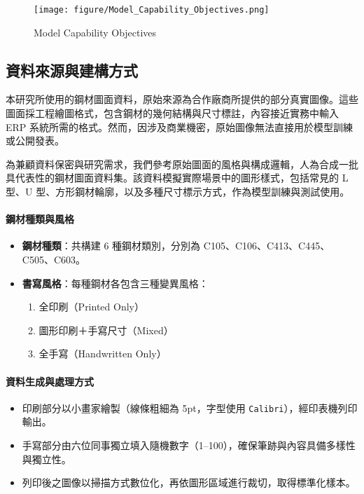 \documentclass[UTF8, fontset=none]{ctexart}
\begin{document}
\begin{figure}[H]
    \centering
    \texttt{[image: figure/Model\_Capability\_Objectives.png]}
    \caption{Model Capability Objectives}
    \label{fig:model-capability}
\end{figure}
\subsection{資料來源與建構方式}

本研究所使用的鋼材圖面資料，原始來源為合作廠商所提供的部分真實圖像。這些圖面採工程繪圖格式，包含鋼材的幾何結構與尺寸標註，內容接近實務中輸入 ERP 系統所需的格式。然而，因涉及商業機密，原始圖像無法直接用於模型訓練或公開發表。

為兼顧資料保密與研究需求，我們參考原始圖面的風格與構成邏輯，人為合成一批具代表性的鋼材圖面資料集。該資料模擬實際場景中的圖形樣式，包括常見的 L 型、U 型、方形鋼材輪廓，以及多種尺寸標示方式，作為模型訓練與測試使用。

\paragraph{鋼材種類與風格}
\begin{itemize}
  \item \textbf{鋼材種類}：共構建 6 種鋼材類別，分別為 C105、C106、C413、C445、C505、C603。
  \item \textbf{書寫風格}：每種鋼材各包含三種變異風格：
    \begin{enumerate}
      \item 全印刷（Printed Only）
      \item 圖形印刷＋手寫尺寸（Mixed）
      \item 全手寫（Handwritten Only）
    \end{enumerate}
\end{itemize}

\paragraph{資料生成與處理方式}
\begin{itemize}
  \item 印刷部分以小畫家繪製（線條粗細為 5pt，字型使用 \texttt{Calibri}），經印表機列印輸出。
  \item 手寫部分由六位同事獨立填入隨機數字（1--100），確保筆跡與內容具備多樣性與獨立性。
  \item 列印後之圖像以掃描方式數位化，再依圖形區域進行裁切，取得標準化樣本。
\end{itemize}
\end{document}
